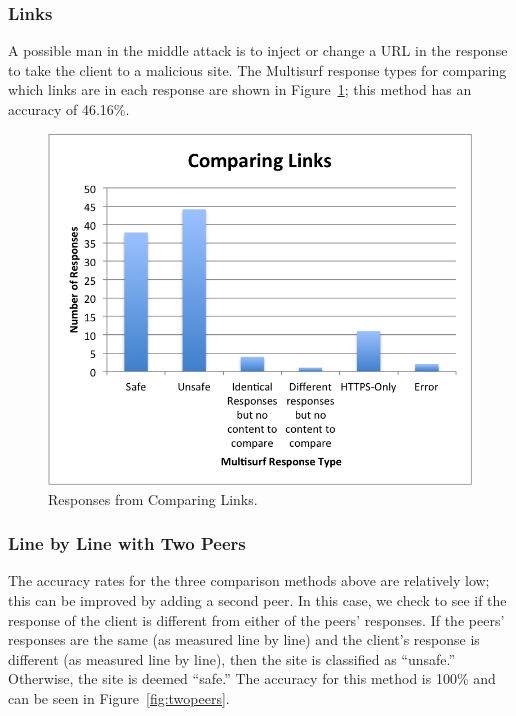 \subsubsection{Links}
A possible man in the middle attack is to inject or change a URL in the response to take the client to a malicious site.  The Multisurf response types for comparing which links are in each response are shown in Figure~\ref{fig:links}; this method has an accuracy of 46.16\%. 

\begin{figure}[htb]
\label{fig:links}
\begin{center}
\includegraphics[width=\linewidth]{links}
\caption{Responses from Comparing Links.}
\end{center}
\end{figure}

\subsubsection{Line by Line with Two Peers}
The accuracy rates for the three comparison methods above are relatively low; this can be improved by adding a second peer.  In this case, we check to see if the response of the client is different from either of the peers' responses.  If the peers' responses are the same (as measured line by line) and the client's response is different (as measured line by line), then the site is classified as ``unsafe.''  Otherwise, the site is deemed ``safe.''  The accuracy for this method is 100\% and can be seen in Figure~\ref{fig:twopeers}.


